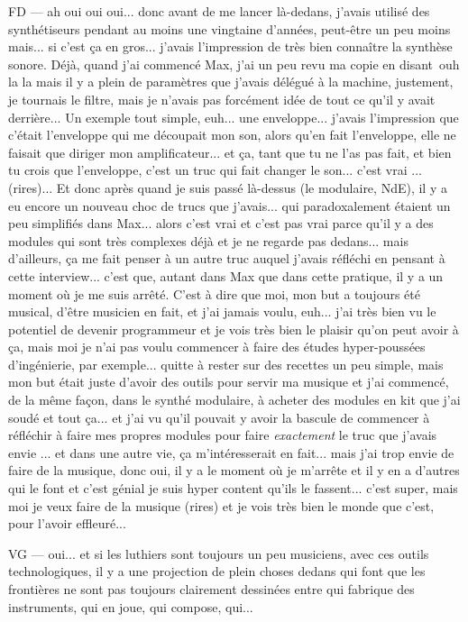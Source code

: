 FD — ah oui oui oui... donc avant de me lancer là-dedans, j'avais utilisé des synthétiseurs pendant au moins une vingtaine d'années, peut-être un peu moins mais... si c'est ça en gros... j'avais l'impression de très bien connaître la synthèse sonore. Déjà, quand j'ai commencé Max, j'ai un peu revu ma copie en disant ouh la la mais il y a plein de paramètres que j'avais délégué à la machine, justement, je tournais le filtre, mais je n'avais pas forcément idée de tout ce qu'il y avait derrière... Un exemple tout simple, euh... une enveloppe... j'avais l'impression que c'était l'enveloppe qui me découpait mon son, alors qu'en fait l'enveloppe, elle ne faisait que diriger mon amplificateur... et ça, tant que tu ne l'as pas fait, et bien tu crois que l'enveloppe, c'est un truc qui fait changer le son... c'est vrai ... (rires)... Et donc après quand je suis passé là-dessus (le modulaire, NdE), il y a eu encore un nouveau choc de trucs que j'avais... qui paradoxalement étaient un peu simplifiés dans Max... alors c'est vrai et c'est pas vrai parce qu'il y a des modules qui sont très complexes déjà et je ne regarde pas dedans... mais d'ailleurs, ça me fait penser à un autre truc auquel j'avais réfléchi en pensant à cette interview... c'est que, autant dans Max que dans cette pratique, il y a un moment où je me suis arrêté. C'est à dire que moi, mon but a toujours été musical, d'être musicien en fait, et j'ai jamais voulu, euh... j'ai très bien vu le potentiel de devenir programmeur et je vois très bien le plaisir qu'on peut avoir à ça, mais moi je n'ai pas voulu commencer à faire des études hyper-poussées d'ingénierie, par exemple... quitte à rester sur des recettes un peu simple, mais mon but était juste d'avoir des outils pour servir ma musique et j'ai commencé, de la même façon, dans le synthé modulaire, à acheter des modules en kit que j'ai soudé et tout ça... et j'ai vu qu'il pouvait y avoir la bascule de commencer à réfléchir à faire mes propres modules pour faire \emph{exactement} le truc que j'avais envie ... et dans une autre vie, ça m'intéresserait en fait... mais j'ai trop envie de faire de la musique, donc oui, il y a le moment où je m'arrête et il y en a d'autres qui le font et c'est génial je suis hyper content qu'ils le fassent... c'est super, mais moi je veux faire de la musique (rires) et je vois très bien le monde que c'est, pour l'avoir effleuré... 

VG — oui... et si les luthiers sont toujours un peu musiciens, avec ces outils technologiques, il y a une projection de plein choses dedans qui font que les frontières ne sont pas toujours clairement dessinées entre qui fabrique des instruments, qui en joue, qui compose, qui... 

